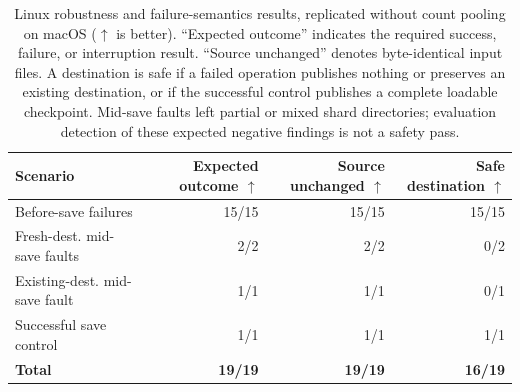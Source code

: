 \begin{table}[t]
  \centering
  \small
  \begin{tabular}{lrrr}
    \toprule
    \textbf{Scenario} & \textbf{Expected outcome $\uparrow$} & \textbf{Source unchanged $\uparrow$} & \textbf{Safe destination $\uparrow$} \\
    \midrule
    Before-save failures & 15/15 & 15/15 & 15/15 \\
    Fresh-dest. mid-save faults & 2/2 & 2/2 & 0/2 \\
    Existing-dest. mid-save fault & 1/1 & 1/1 & 0/1 \\
    Successful save control & 1/1 & 1/1 & 1/1 \\
    \midrule
    \textbf{Total} & \textbf{19/19} & \textbf{19/19} & \textbf{16/19} \\
    \bottomrule
  \end{tabular}
  \caption{Linux robustness and failure-semantics results, replicated without
  count pooling on macOS ($\uparrow$ is better). ``Expected outcome'' indicates
  the required success, failure, or interruption result. ``Source unchanged''
  denotes byte-identical input files. A destination is safe if a failed operation
  publishes nothing or preserves an existing destination, or if the successful
  control publishes a complete loadable checkpoint. Mid-save faults left
  partial or mixed shard directories; evaluation detection of these expected
  negative findings is not a safety pass.}
  \label{tab:robustness}
\end{table}
